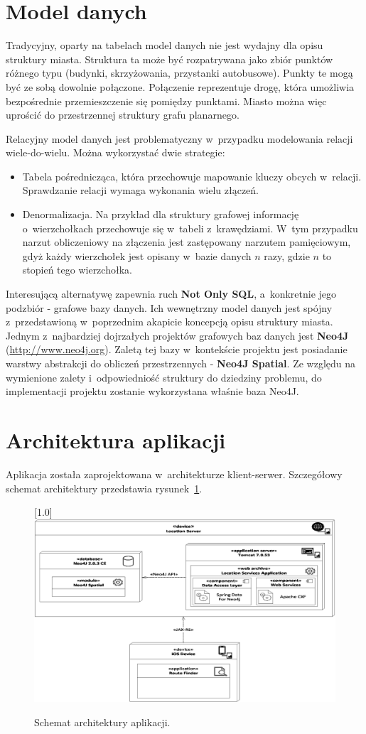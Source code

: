 \documentclass[a4paper,12pt]{article}
\begin{document}
	\section*{Model danych}

	Tradycyjny, oparty na tabelach model danych nie jest wydajny dla opisu struktury miasta. Struktura ta może być rozpatrywana jako zbiór punktów różnego typu (budynki, skrzyżowania, przystanki autobusowe). Punkty te mogą być ze sobą dowolnie połączone. Połączenie reprezentuje drogę, która umożliwia bezpośrednie przemieszczenie się pomiędzy punktami. Miasto można więc uprościć do przestrzennej struktury grafu planarnego.

	Relacyjny model danych jest problematyczny w~przypadku modelowania relacji wiele-do-wielu. Można wykorzystać dwie strategie:

	\begin{itemize}
		\item Tabela pośrednicząca, która przechowuje mapowanie kluczy obcych w~relacji. Sprawdzanie relacji wymaga wykonania wielu złączeń.
		\item Denormalizacja. Na przykład dla struktury grafowej informację o~wierzchołkach przechowuje się w~tabeli z~krawędziami. W~tym przypadku narzut obliczeniowy na złączenia jest zastępowany narzutem pamięciowym, gdyż każdy wierzchołek jest opisany w~bazie danych $n$ razy, gdzie $n$ to stopień tego wierzchołka.
	\end{itemize}

	Interesującą alternatywę zapewnia ruch \textbf{Not Only SQL}, a~konkretnie jego podzbiór - grafowe bazy danych. Ich wewnętrzny model danych jest spójny z~przedstawioną w~poprzednim akapicie koncepcją opisu struktury miasta. Jednym z~najbardziej dojrzałych projektów grafowych baz danych jest \textbf{Neo4J} (\url{http://www.neo4j.org}). Zaletą tej bazy w~kontekście projektu jest posiadanie warstwy abstrakcji do obliczeń przestrzennych - \textbf{Neo4J Spatial}. Ze względu na wymienione zalety i~odpowiedniość struktury do dziedziny problemu, do implementacji projektu zostanie wykorzystana właśnie baza Neo4J.

	\section*{Architektura aplikacji}

	Aplikacja została zaprojektowana w~architekturze klient-serwer. Szczegółowy schemat architektury przedstawia rysunek~\ref{fig:architecture}. 

	\begin{figure}[ht!]
		\centering
		\scalebox{0.7}[1.0]{
			\includegraphics{graphics/architecture.eps}
		}

		\caption{Schemat architektury aplikacji.}
		\label{fig:architecture}
	\end{figure}
\end{document}
